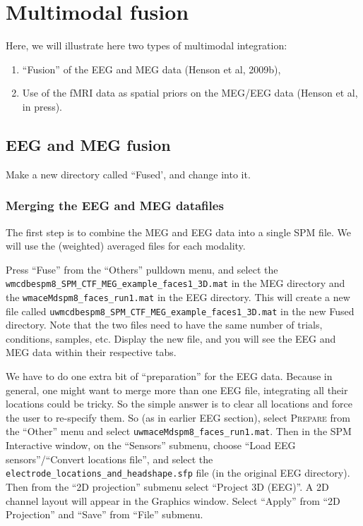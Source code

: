\section{Multimodal fusion\label{multimodal:fusion}}

Here, we will illustrate here two types of multimodal integration:
\begin{enumerate}
 \item ``Fusion'' of the EEG and MEG data (Henson et al, 2009b),
 \item Use of the fMRI data as spatial priors on the MEG/EEG data (Henson et al, in press).
\end{enumerate}

\subsection{EEG and MEG fusion \label{multimodal:fusion:eegmeg:fusion}}

Make a new directory called ``Fused', and change into it.

\subsubsection{Merging the EEG and MEG datafiles \label{multimodal:fusion:eegmeg:merge}}

The first step is to combine the MEG and EEG data into a single SPM file. We will use the (weighted) averaged files for each modality.

Press ``Fuse'' from the ``Others'' pulldown menu, and select the \texttt{wmcdbespm8\_\-SPM\_\-CTF\_\-MEG\_\-example\_\-faces1\_\-3D.mat} in the MEG directory and the \texttt{wmaceMdspm8\_faces\_run1.mat} in the EEG directory. This will create a new file called \texttt{uwmcdbespm8\_\-SPM\_\-CTF\_\-MEG\_\-example\_\-faces1\_\-3D.mat} in the new Fused directory. Note that the two files need to have the same number of trials, conditions, samples, etc. Display the new file, and you will see the EEG and MEG data within their respective tabs.

We have to do one extra bit of ``preparation'' for the EEG data. Because in general, one might want to merge more than one EEG file, integrating all their locations could be tricky. So the simple answer is to clear all locations and force the user to re-specify them. So (as in earlier EEG section), select \textsc{Prepare} from the ``Other'' menu and select \texttt{uwmaceMdspm8\_faces\_run1.mat}. Then in the SPM Interactive window, on the ``Sensors'' submenu, choose ``Load EEG sensors''/``Convert locations file'', and select the \texttt{electrode\_locations\_and\_headshape.sfp} file (in the original EEG directory). Then from the ``2D projection'' submenu select ``Project 3D (EEG)''. A 2D channel layout will appear in the Graphics window. Select ``Apply'' from ``2D Projection'' and ``Save'' from ``File'' submenu.

